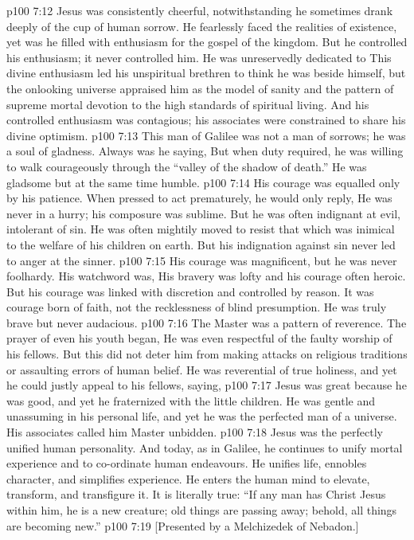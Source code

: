 \vs p100 7:12 Jesus was consistently cheerful, notwithstanding he sometimes drank deeply of the cup of human sorrow. He fearlessly faced the realities of existence, yet was he filled with enthusiasm for the gospel of the kingdom. But he controlled his enthusiasm; it never controlled him. He was unreservedly dedicated to  This divine enthusiasm led his unspiritual brethren to think he was beside himself, but the onlooking universe appraised him as the model of sanity and the pattern of supreme mortal devotion to the high standards of spiritual living. And his controlled enthusiasm was contagious; his associates were constrained to share his divine optimism.
\vs p100 7:13 This man of Galilee was not a man of sorrows; he was a soul of gladness. Always was he saying,  But when duty required, he was willing to walk courageously through the “valley of the shadow of death.” He was gladsome but at the same time humble.
\vs p100 7:14 His courage was equalled only by his patience. When pressed to act prematurely, he would only reply,  He was never in a hurry; his composure was sublime. But he was often indignant at evil, intolerant of sin. He was often mightily moved to resist that which was inimical to the welfare of his children on earth. But his indignation against sin never led to anger at the sinner.
\vs p100 7:15 His courage was magnificent, but he was never foolhardy. His watchword was,  His bravery was lofty and his courage often heroic. But his courage was linked with discretion and controlled by reason. It was courage born of faith, not the recklessness of blind presumption. He was truly brave but never audacious.
\vs p100 7:16 The Master was a pattern of reverence. The prayer of even his youth began,  He was even respectful of the faulty worship of his fellows. But this did not deter him from making attacks on religious traditions or assaulting errors of human belief. He was reverential of true holiness, and yet he could justly appeal to his fellows, saying, 
\vs p100 7:17 Jesus was great because he was good, and yet he fraternized with the little children. He was gentle and unassuming in his personal life, and yet he was the perfected man of a universe. His associates called him Master unbidden.
\vs p100 7:18 Jesus was the perfectly unified human personality. And today, as in Galilee, he continues to unify mortal experience and to co\hyp{}ordinate human endeavours. He unifies life, ennobles character, and simplifies experience. He enters the human mind to elevate, transform, and transfigure it. It is literally true: “If any man has Christ Jesus within him, he is a new creature; old things are passing away; behold, all things are becoming new.”
\vsetoff
\vs p100 7:19 [Presented by a Melchizedek of Nebadon.]
\quizlink
